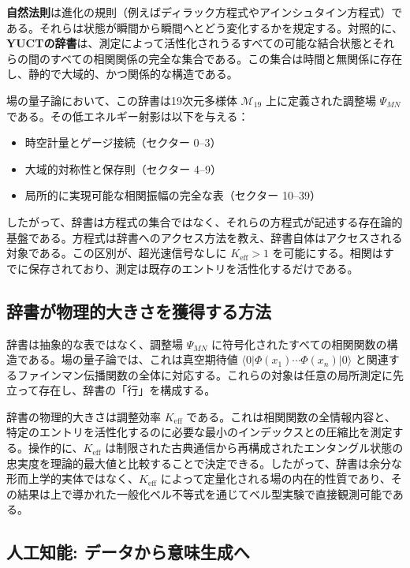 \documentclass[12pt,a4paper]{article}
\theoremstyle{definition}
\theoremstyle{remark}
\begin{document}
	\textbf{自然法則}は進化の規則（例えばディラック方程式やアインシュタイン方程式）である。それらは状態が瞬間から瞬間へとどう変化するかを規定する。対照的に、\textbf{YUCTの辞書}は、測定によって活性化されうるすべての可能な結合状態とそれらの間のすべての相関関係の完全な集合である。この集合は時間と無関係に存在し、静的で大域的、かつ関係的な構造である。
	
	場の量子論において、この辞書は19次元多様体 $\mathcal{M}_{19}$ 上に定義された調整場 $\Psi_{MN}$ である。その低エネルギー射影は以下を与える：
	\begin{itemize}
		\item 時空計量とゲージ接続（セクター 0--3）
		\item 大域的対称性と保存則（セクター 4--9）
		\item 局所的に実現可能な相関振幅の完全な表（セクター 10--39）
	\end{itemize}
	したがって、辞書は方程式の集合ではなく、それらの方程式が記述する存在論的基盤である。方程式は辞書へのアクセス方法を教え、辞書自体はアクセスされる対象である。この区別が、超光速信号なしに $K_{\mathrm{eff}} > 1$ を可能にする。相関はすでに保存されており、測定は既存のエントリを活性化するだけである。
	
	\subsection*{辞書が物理的大きさを獲得する方法}
	
	辞書は抽象的な表ではなく、調整場 $\Psi_{MN}$ に符号化されたすべての相関関数の構造である。場の量子論では、これは真空期待値 $\langle 0|\Phi(x_1)\cdots\Phi(x_n)|0\rangle$ と関連するファインマン伝播関数の全体に対応する。これらの対象は任意の局所測定に先立って存在し、辞書の「行」を構成する。
	
	辞書の物理的大きさは調整効率 $K_{\mathrm{eff}}$ である。これは相関関数の全情報内容と、特定のエントリを活性化するのに必要な最小のインデックスとの圧縮比を測定する。操作的に、$K_{\mathrm{eff}}$ は制限された古典通信から再構成されたエンタングル状態の忠実度を理論的最大値と比較することで決定できる。したがって、辞書は余分な形而上学的実体ではなく、$K_{\mathrm{eff}}$ によって定量化される場の内在的性質であり、その結果は上で導かれた一般化ベル不等式を通じてベル型実験で直接観測可能である。
	
	\subsection{人工知能: データから意味生成へ}
	
\end{document}
